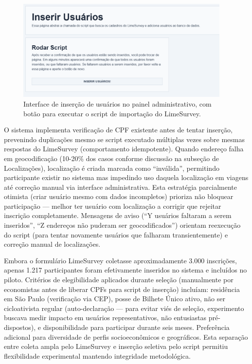 \begin{figure}[H]
  \centering
  \includegraphics[width=0.95\textwidth]{figuras/inserir_usuarios.PNG}
  \caption{Interface de inserção de usuários no painel administrativo, com botão para executar o script de importação do LimeSurvey.}
  \label{fig:insercao_usuarios}
\end{figure}

O sistema implementa verificação de CPF existente antes de tentar inserção, prevenindo duplicações mesmo se script executado múltiplas vezes sobre mesmas respostas do LimeSurvey (comportamento idempotente). Quando endereço falha em geocodificação (10-20\% dos casos conforme discussão na subseção de Localizações), localização é criada marcada como ``inválida'', permitindo participante existir no sistema mas impedindo uso daquela localização em viagens até correção manual via interface administrativa. Esta estratégia parcialmente otimista (criar usuário mesmo com dados incompletos) prioriza não bloquear participação --- melhor ter usuário com localização a corrigir que rejeitar inscrição completamente. Mensagens de aviso (``Y usuários faltaram a serem inseridos'', ``Z endereços não puderam ser geocodificados'') orientam reexecução do script (para tentar novamente usuários que falharam transientemente) e correção manual de localizações.

Embora o formulário LimeSurvey coletasse aproximadamente 3.000 inscrições, apenas 1.217 participantes foram efetivamente inseridos no sistema e incluídos no piloto. Critérios de elegibilidade aplicados durante seleção (manualmente por economistas antes de liberar CPFs para script de inserção) incluíam: residência em São Paulo (verificação via CEP), posse de Bilhete Único ativo, não ser cicloativista regular (auto-declaração --- para evitar viés de seleção, experimento buscava medir impacto em usuários representativos, não entusiastas pré-dispostos), e disponibilidade para participar durante seis meses. Preferência adicional para diversidade de perfis socioeconômicos e geográficos. Esta separação entre coleta ampla pelo LimeSurvey e inserção seletiva pelo script permitiu flexibilidade experimental mantendo integridade metodológica.

